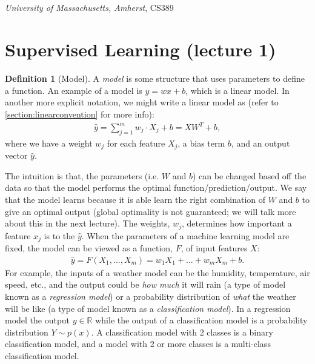 \documentclass[11pt]{article}
\numberwithin{equation}{section}
\theoremstyle{definition}%
\newtheorem{definition}{Definition}[section]%
\begin{document}
\noindent
\begin{center}
    \section*{}
    \subsection*{}
    \emph{University of Massachusetts, Amherst}, CS389
\end{center}


\section{Supervised Learning (lecture 1)}
\begin{definition}[Model]
A \emph{model} is some structure that uses parameters to define a function. An example of a model is $y= wx + b$, which is a linear model. In another more explicit notation, we might write a linear model as (refer to \autoref{section:linearconvention} for more info):
\begin{align}
    \hat{y} = \sum_{j=1}^{m}{w_j \cdot X_j + b} = XW^{T} + b,
\end{align}
where we have a weight $w_j$ for each feature $X_j$, a bias term $b$, and an output vector $\hat{y}$. 
\end{definition}

The intuition is that, the parameters (i.e. $W$ and $b$) can be changed based off the data so that the model performs the optimal function/prediction/output. We say that the model learns because it is able learn the right combination of $W$ and $b$ to give an optimal output (global optimality is not guaranteed; we will talk more about this in the next lecture). The weights, $w_j$, determines how important a feature $x_j$ is to the $\hat{y}$. When the parameters of a machine learning model are fixed, the model can be viewed as a function, $F$, of input features $X$:
\begin{align}
    \hat{y} = F(X_1, ..., X_m) = w_1 X_1 + ... + w_m X_m + b.
\end{align}
For example, the inputs of a weather model can be the humidity, temperature, air speed, etc., and the output could be \emph{how much} it will rain (a type of model known as a \emph{regression model}) or a probability distribution of \emph{what} the weather will be like (a type of model known as a \emph{classification model}). In a regression model the output $y \in \mathbb{R}$ while the output of a classification model is a probability distribution $Y \sim p(x)$. A classification model with 2 classes is a binary classification model, and a model with 2 or more classes is a multi-class classification model.
\end{document}
